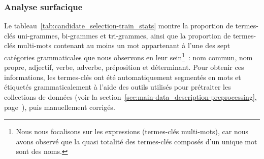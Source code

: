       \subsubsection{Analyse surfacique}
      \label{subsubsec:main:domain_independent_keyphrase_extraction-keyphrase_candidate_selection-analysis_of_keyphrase_properties-shalow_analysis}
      Le tableau~\ref{tab:candidate_selection-train_stats} montre la
      proportion de termes-clés uni-grammes, bi-grammes et tri-gram\-mes, ainsi
      que la proportion de termes-clés multi-mots contenant au moins un mot
      appartenant à l'une des sept catégories grammaticales que nous observons
      en leur sein\footnote{ Nous nous focalisons sur les expressions
      (termes-clés multi-mots), car nous avons observé que la quasi totalité des
      termes-clés composés d'un unique mot sont des noms. }~: nom commun, nom
      propre, adjectif, verbe, adverbe, préposition et déterminant. Pour obtenir
      ces informations, les termes-clés ont été automatiquement segmentés en
      mots et étiquetés grammaticalement à l'aide des outils utilisés pour
      prétraiter les collections de données (voir la
      section~\ref{sec:main-data_description-preprocessing},
      page~\pageref{sec:main-data_description-preprocessing}), puis manuellement
      corrigés.
